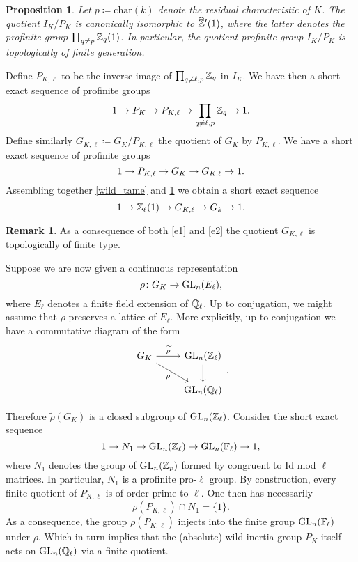\documentclass[10pt,a4paper]{amsart}
\numberwithin{equation}{subsection}
\theoremstyle{plain}
\newtheorem{prop}[theorem]{Proposition}
\theoremstyle{definition}
\newtheorem{rema}[theorem]{Remark}
\theoremstyle{remark}
\numberwithin{equation}{section}
\begin{document}
\begin{prop}{\cite[Corollary 13]{bommel}} \label{tame_mon} Let $p \coloneqq \mathrm{char}(k)$ denote the residual characteristic of $K$.
The quotient $I_K / P_K$ is canonically isomorphic to $\widehat{\mathbb Z}'(1)$, where the latter denotes the profinite group $\prod_{q \neq p} \mathbb Z_q(1)$. In particular, the quotient profinite group $I_K / P_K$ is topologically of finite generation.
\end{prop}



Define $P_{K, \ell} $ to be the inverse image of $\prod_{q \neq \ell, p } \mathbb Z_q$ in $I_K$. We have then a short exact sequence of profinite groups
	\[
		1 \to P_K \to P_{K, \ell} \to \prod_{q \neq \ell, p } \mathbb Z_q \to 1.
	\]
Define similarly $G_{K, \ell} \coloneqq G_K / P_{K, \ell}$ the quotient of $G_K$ by $P_{K, \ell}$. We have a short exact sequence of profinite groups
	\begin{equation} \label{e1}
		1 \to P_{K, \ell} \to G_K \to G_{K, \ell} \to 1.
	\end{equation}
Assembling together \eqref{wild_tame} and \cref{tame_mon} we obtain a short exact sequence
	\begin{equation} \label{e2}
		1 \to \mathbb Z_\ell(1) \to G_{K, \ell} \to G_k \to 1.
	\end{equation}
	
\begin{rema}
As a consequence of both \eqref{e1} and \eqref{e2} the quotient $G_{K, \ell}$ is topologically of finite type.
\end{rema}

Suppose we are now given a continuous representation
	\[
		\rho \colon G_K \to \mathrm{GL}_n (E_\ell),
	\]
where $E_\ell$ denotes a finite field extension of $\mathbb Q_\ell$. Up to conjugation, we might assume that $\rho$ preserves a lattice of $E_\ell$. More explicitly, up to conjugation we have a commutative diagram of the form
	\[
	\begin{tikzcd}
		G_K \ar{r}{\widetilde{\rho}} \ar{dr}[swap]{\rho} & \GLn(\bZ_\ell) \ar{d} \\
						& \GLn(\Q_\ell)
	\end{tikzcd}.
	\]
	
Therefore $\widetilde{\rho} \left( G_K \right) $ is a closed subgroup of $\mathrm{GL}_n(\mathbb Z_\ell)$. Consider the short exact sequence
	\[
		1 \to N_1 \to \mathrm{GL}_n(\mathbb Z_\ell) \to \mathrm{GL}_n(\mathbb F_\ell) \to 1,
	\]
where $N_1$ denotes the group of $\mathrm{GL}_n(\mathbb Z_p)$ formed by congruent to $\mathrm{Id}$ mod $\ell$ matrices. In particular, $N_1$ is a profinite pro-$\ell$ group.
By construction, every finite quotient of $P_{K, \ell}$ is of order prime to $\ell$. One then has necessarily
	\[
		\rho \left( P_{K, \ell}  \right) \cap N_1 = \{1 \}.
	\] 
As a consequence, the group $\rho( P_{K, \ell})$ injects into the finite group $\mathrm{GL}_n(\mathbb F_\ell)$ under $\rho$.
Which in turn implies that the (absolute) wild inertia group $P_K$ itself acts on $\mathrm{GL}_n(\mathbb{Q}_\ell)$ via a finite quotient. 
\end{document}
